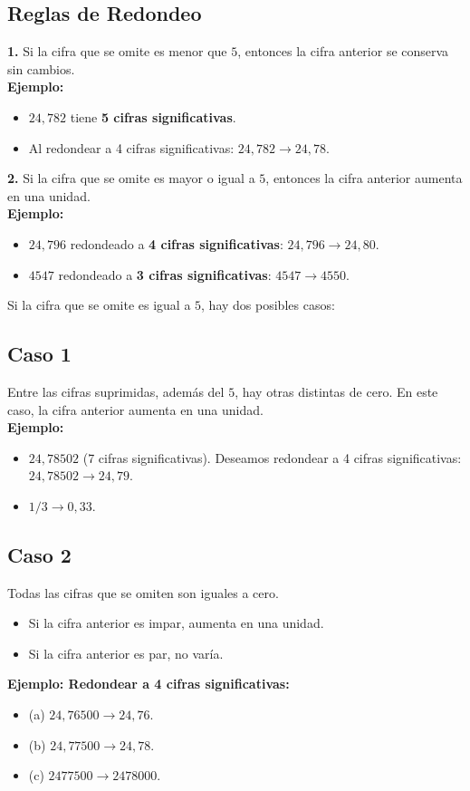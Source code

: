\subsection{Reglas de Redondeo}
\textbf{1.} Si la cifra que se omite es menor que $5$, entonces la cifra anterior se conserva sin cambios.\\  
   \textbf{Ejemplo:}  
   \begin{itemize}
       \item $24,782$ tiene \textbf{5 cifras significativas}.
       \item Al redondear a 4 cifras significativas: $24,782 \to 24,78$.
   \end{itemize}
\textbf{2.} Si la cifra que se omite es mayor o igual a $5$, entonces la cifra anterior aumenta en una unidad.\\  
   \textbf{Ejemplo:}  
   \begin{itemize}
       \item $24,796$ redondeado a \textbf{4 cifras significativas}:  
       $24,796 \to 24,80$.
       \item $4547$ redondeado a \textbf{3 cifras significativas}:  
       $4547 \to 4550$.
   \end{itemize}
Si la cifra que se omite es igual a $5$, hay dos posibles casos:
\subsection{Caso 1}
Entre las cifras suprimidas, además del $5$, hay otras distintas de cero.  
En este caso, la cifra anterior aumenta en una unidad.\\  
\textbf{Ejemplo:}  
\begin{itemize}
    \item $24,78502$ (7 cifras significativas).  
    Deseamos redondear a 4 cifras significativas:  
    $24,78502 \to 24,79$.
    \item $1/3 \to 0,33$.
\end{itemize}
\subsection{Caso 2}
Todas las cifras que se omiten son iguales a cero.
\begin{itemize}
    \item Si la cifra anterior es impar, aumenta en una unidad.
    \item Si la cifra anterior es par, no varía.
\end{itemize}

\textbf{Ejemplo: Redondear a 4 cifras significativas:}  
\begin{itemize}
    \item (a) $24,76500 \to 24,76$.
    \item (b) $24,77500 \to 24,78$.
    \item (c) $2477500 \to 2478000$.
\end{itemize}







